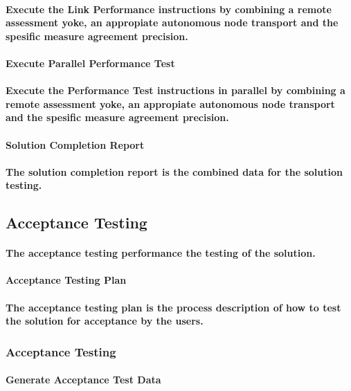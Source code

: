 \documentclass{acm_proc_article-sp}
\begin{document}
\paragraph{Execute the Link Performance instructions by combining a remote assessment yoke, an appropiate autonomous node transport and the spesific measure agreement precision.}
\paragraph{Execute Parallel Performance Test}
\paragraph{Execute the Performance Test instructions in parallel by combining a remote assessment yoke, an appropiate autonomous node transport and the spesific measure agreement precision.}
\paragraph{Solution Completion Report}
\paragraph{The solution completion report is the combined data for the solution testing.}
\subsection{Acceptance Testing}
\paragraph{The acceptance testing performance the testing of the solution.}
\paragraph{Acceptance Testing Plan}
\paragraph{The acceptance testing plan is the process description of how to test the solution for acceptance by the users.}
\subsubsection{Acceptance Testing}
\paragraph{Generate Acceptance Test Data}
\end{document}

